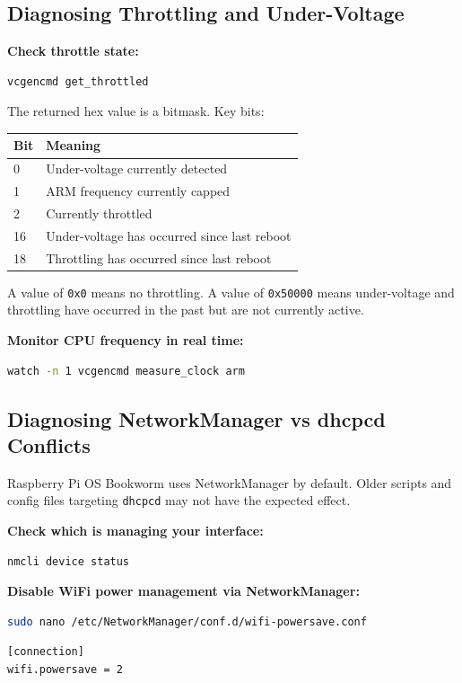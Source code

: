 \documentclass[11pt,letter]{article}
\begin{document}
\subsection{Diagnosing Throttling and Under-Voltage}

\textbf{Check throttle state:}
\begin{lstlisting}[language=bash]
vcgencmd get_throttled
\end{lstlisting}

The returned hex value is a bitmask. Key bits:

\begin{center}
\begin{tabular}{ll}
\toprule
\textbf{Bit} & \textbf{Meaning} \\
\midrule
0 & Under-voltage currently detected \\
1 & ARM frequency currently capped \\
2 & Currently throttled \\
16 & Under-voltage has occurred since last reboot \\
18 & Throttling has occurred since last reboot \\
\bottomrule
\end{tabular}
\end{center}

A value of \texttt{0x0} means no throttling. A value of \texttt{0x50000} means under-voltage and throttling have occurred in the past but are not currently active.

\textbf{Monitor CPU frequency in real time:}
\begin{lstlisting}[language=bash]
watch -n 1 vcgencmd measure_clock arm
\end{lstlisting}

\subsection{Diagnosing NetworkManager vs dhcpcd Conflicts}
\label{sec:networkmanager}

Raspberry Pi OS Bookworm uses NetworkManager by default. Older scripts and config files targeting \texttt{dhcpcd} may not have the expected effect.

\textbf{Check which is managing your interface:}
\begin{lstlisting}[language=bash]
nmcli device status
\end{lstlisting}

\textbf{Disable WiFi power management via NetworkManager:}
\begin{lstlisting}[language=bash]
sudo nano /etc/NetworkManager/conf.d/wifi-powersave.conf
\end{lstlisting}
\begin{lstlisting}[caption={NetworkManager WiFi power save config}]
[connection]
wifi.powersave = 2
\end{lstlisting}
\end{document}
